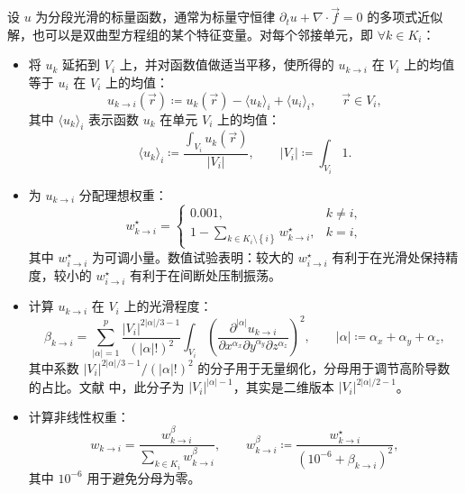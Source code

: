 设 $u$ 为分段光滑的标量函数，通常为标量守恒律 $\partial_{t}u+\nabla\cdot\vec{f}=0$ 的多项式近似解，也可以是双曲型方程组的某个特征变量。对每个邻接单元，即
$\forall k\in K_{i}$：
\begin{itemize}
\item 将 $u_{k}$ 延拓到 $V_{i}$ 上，并对函数值做适当平移，使所得的
$u_{k\to i}$ 在 $V_{i}$ 上的均值等于 $u_{i}$ 在 $V_{i}$ 上的均值：
\begin{equation}
u_{k\to i}(\vec{r})\coloneqq u_{k}(\vec{r})-\langle u_{k}\rangle_{i}+\langle u_{i}\rangle_{i},\qquad\vec{r}\in V_{i},
\end{equation}
其中 $\langle u_{k}\rangle_{i}$ 表示函数 $u_{k}$ 在单元 $V_{i}$ 上的均值：
\begin{equation}
\langle u_{k}\rangle_{i}\coloneqq\frac{\int_{V_{i}}u_{k}(\vec{r})}{\vert V_{i}\vert},\qquad\vert V_{i}\vert\coloneqq\int_{V_{i}}1.
\end{equation}
\item 为 $u_{k\to i}$ 分配理想权重：
\begin{equation}
w_{k\to i}^{\star}=\begin{cases}
0.001, & k\ne i,\\
1-\sum_{k\in K_{i}\setminus\left\{ i\right\} }w_{k\to i}^{\star}, & k=i,
\end{cases}
\end{equation}
其中 $w_{i\to i}^{\star}$ 为可调小量。数值试验表明：较大的 $w_{i\to i}^{\star}$ 有利于在光滑处保持精度，较小的
$w_{i\to i}^{\star}$ 有利于在间断处压制振荡。
\item 计算 $u_{k\to i}$ 在 $V_{i}$ 上的光滑程度：
\begin{equation}
\beta_{k\to i}=\sum_{\vert\alpha\vert=1}^{p}\frac{\vert V_{i}\vert^{2\vert\alpha\vert/3-1}}{(\vert\alpha\vert!)^{2}}\int_{V_{i}}\left(\frac{\partial^{\vert\alpha\vert}u_{k\to i}}{\partial x^{\alpha_{x}}\partial y^{\alpha_{y}}\partial z^{\alpha_{z}}}\right)^{2},\qquad\vert\alpha\vert\coloneqq\alpha_{x}+\alpha_{y}+\alpha_{z},
\end{equation}
其中系数 $\vert V_{i}\vert^{2\vert\alpha\vert/3-1}/(\vert\alpha\vert!)^{2}$
的分子用于无量纲化，分母用于调节高阶导数的占比。文献 \cite{Zhu_2013} 中，此分子为 $\vert V_{i}\vert^{\vert\alpha\vert-1}$，其实是二维版本
$\vert V_{i}\vert^{2\vert\alpha\vert/2-1}$。
\item 计算非线性权重：
\begin{equation}
w_{k\to i}=\frac{w_{k\to i}^{\beta}}{\sum_{k\in K_{i}}w_{k\to i}^{\beta}},\qquad w_{k\to i}^{\beta}\coloneqq\frac{w_{k\to i}^{\star}}{\left(10^{-6}+\beta_{k\to i}\right)^{2}},
\end{equation}
其中 $10^{-6}$ 用于避免分母为零。
\end{itemize}

